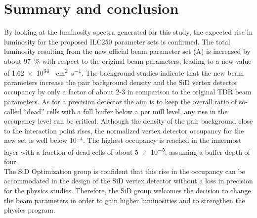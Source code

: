 \section{Summary and conclusion}
By looking at the luminosity spectra generated for this study, the expected rise in luminosity for the proposed ILC250 parameter sets is confirmed.
The total luminosity resulting from the new official beam parameter set (A) is increased by about \SI{97}{\percent} with respect to the original beam parameters, leading to a new value of \SI{1.62e34}{\per\centi\meter\squared\per\second}.
The background studies indicate that the new beam parameters increase the \Pep\Pem pair background density and the SiD vertex detector occupancy by only a factor of about 2-3 in comparison to the original TDR beam parameters.
As for a precision detector the aim is to keep the overall ratio of so-called ``dead'' cells with a full buffer below a per mill level, any rise in the occupancy level can be critical.
Although the density of the pair background close to the interaction point rises, the normalized vertex detector occupancy for the new set is well below 10$^{-4}$.
The highest occupancy is reached in the innermost layer with a fraction of dead cells of about \num{5e-5}, assuming a buffer depth of four.\\
The SiD Optimization group is confident that this rise in the occupancy can be accommodated in the design of the SiD vertex detector without a loss in precision for the physics studies.
Therefore, the SiD group welcomes the decision to change the beam parameters in order to gain higher luminosities and to strengthen the physics program.